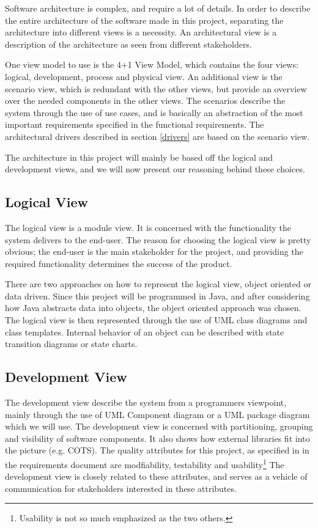 Software architecture is complex, and require a lot of details. In order to  describe the entire architecture of the software made in this project, separating the architecture into different views is a necessity. An architectural view is a description of the architecture as seen from different stakeholders. 

 One view model to use is the 4+1 View Model, which contains the four views: logical, development, process and physical view. An additional view is the scenario view, which is redundant with the other views, but provide an overview over the needed components in the other views. The scenarios describe the system through the use of use cases, and is basically an abstraction of the most important requirements specified in the functional requirements.  The architectural drivers described in section \ref{drivers} are based on the scenario view.
 
 The architecture in this project will mainly be based off the logical and development views, and we will now present our reasoning behind these choices.

\subsection{Logical View}
The logical view is a module view. It is concerned with the functionality the system delivers to the end-user. The reason for choosing the logical view is pretty obvious; the end-user is the main stakeholder for the project, and providing the required functionality determines the success of the product.

There are two approaches on how to represent the logical view, object oriented or data driven. Since this project will be programmed in Java, and after considering how Java abstracts data into objects, the object oriented approach was chosen. The logical view is then represented through the use of UML class diagrams and class templates.  Internal behavior of an object can be described with state transition diagrams or state charts. \cite{4plus1view}

\subsection{Development View}

The development view describe the system from a programmers viewpoint, mainly through the use of UML Component diagram or a UML package diagram which we will use.  The development view is concerned with partitioning, grouping and visibility of software components. It also shows how external libraries fit into the picture (e.g. COTS). The quality attributes for this project, as specified in in the requirements document \cite{reqdoc} are modfiability, testability and usability\footnote{Usability is not so much emphasized as the two others.} The development view is closely related to these attributes, and serves as a vehicle of communication for stakeholders interested in these attributes.


